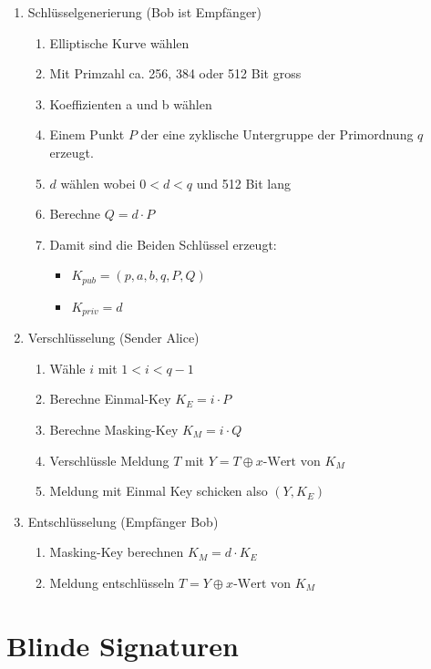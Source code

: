 \documentclass[12pt]{scrartcl}
\begin{document}
\begin{enumerate}
    \item Schlüsselgenerierung (Bob ist Empfänger)
    \begin{enumerate}
        \item Elliptische Kurve wählen
        \item Mit Primzahl ca. 256, 384 oder 512 Bit gross
        \item Koeffizienten a und b wählen
        \item Einem Punkt $P$ der eine zyklische Untergruppe der Primordnung $q$ erzeugt.
        \item $d$ wählen wobei $ 0 < d < q $ und 512 Bit lang
        \item Berechne $Q = d \cdot P$
        \item Damit sind die Beiden Schlüssel erzeugt:
        \begin{itemize}
            \item[] $K_{pub} = (p, a, b, q, P, Q)$ 
            \item[] $K_{priv} = d$
        \end{itemize}
    \end{enumerate}
    \item Verschlüsselung (Sender Alice)
    \begin{enumerate}
        \item Wähle $i$ mit $1 < i < q - 1$
        \item Berechne Einmal-Key $K_E = i \cdot P$
        \item Berechne Masking-Key $K_M = i \cdot Q$
        \item Verschlüssle Meldung $T$ mit $Y = T \oplus x \text{-Wert von } K_M$
        \item Meldung mit Einmal Key schicken also $(Y, K_E)$
    \end{enumerate}
    \item Entschlüsselung (Empfänger Bob)
    \begin{enumerate}
        \item Masking-Key berechnen $K_M = d \cdot K_E$
        \item Meldung entschlüsseln $T = Y \oplus x \text{-Wert von } K_M$
    \end{enumerate}
\end{enumerate}

\newpage
\section{Blinde Signaturen}
\end{document}
